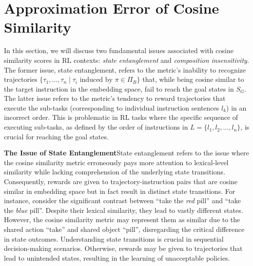 \documentclass{article}
\theoremstyle{plain}
\theoremstyle{definition}
\theoremstyle{remark}
\begin{document}
\section{Approximation Error of Cosine Similarity}
\label{sec:approximation_error}
In this section, we will discuss two fundamental issues associated with cosine similarity scores in RL contexts: \emph{state entanglement} and \emph{composition insensitivity}. The former issue, state entanglement, refers to the metric's inability to recognize trajectories $\{\tau_1, ..., \tau_n \mid \tau_i \text{ induced by } \pi \in \Pi_B\}$ that, while being cosine similar to the target instruction in the embedding space, fail to reach the goal states in $S_G$. The latter issue refers to the metric's tendency to reward trajectories that execute the sub-tasks (corresponding to individual instruction sentences $l_k$) in an incorrect order. This is problematic in RL tasks where the specific sequence of executing sub-tasks, as defined by the order of instructions in $L = \{l_1, l_2, \ldots, l_n\}$, is crucial for reaching the goal states.

\noindent \textbf{The Issue of State Entanglement}\quad State entanglement refers to the issue where the cosine similarity metric erroneously pays more attention to lexical-level similarity while lacking comprehension of the underlying state transitions. Consequently, rewards are given to trajectory-instruction pairs that are cosine similar in embedding space but in fact result in distinct state transitions. For instance, consider the significant contrast between ``take the \emph{red} pill'' and ``take the \emph{blue} pill''. Despite their lexical similarity, they lead to vastly different states. However, the cosine similarity metric may represent them as similar due to the shared action ``take'' and shared object ``pill'', disregarding the critical difference in state outcomes. Understanding state transitions is crucial in sequential decision-making scenarios. Otherwise, rewards may be given to trajectories that lead to unintended states, resulting in the learning of unacceptable policies.
\end{document}

